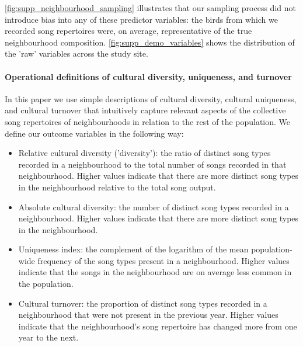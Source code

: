 \documentclass[9pt, onecolumn, twoside, lineno]{gsajnl}
\begin{document}
\noindent\autoref{fig:supp_neighbourhood_sampling} illustrates that our sampling process did not introduce bias into any of these predictor variables: the birds from which we recorded song repertoires were, on average, representative of the true neighbourhood composition. \autoref{fig:supp_demo_variables} shows the distribution of the 'raw' variables across the study site.

\paragraph{Operational definitions of cultural diversity, uniqueness, and turnover}
\label{sc:op-definitions}

In this paper we use simple descriptions of cultural diversity, cultural uniqueness, and cultural turnover that intuitively capture relevant aspects of the collective song repertoires of neighbourhoods in relation to the rest of the population. We define our outcome variables in the following way:

\begin{itemize}
    \item Relative cultural diversity ('diversity'): the ratio of distinct song types recorded in a neighbourhood to the total number of songs recorded in that neighbourhood. Higher values indicate that there are more distinct song types in the neighbourhood relative to the total song output.
    \item Absolute cultural diversity: the number of distinct song types recorded in a neighbourhood. Higher values indicate that there are more distinct song types in the neighbourhood.
    \item Uniqueness index: the complement of the logarithm of the mean population-wide frequency of the song types present in a neighbourhood. Higher values indicate that the songs in the neighbourhood are on average less common in the population.
    \item Cultural turnover: the proportion of distinct song types recorded in a neighbourhood that were not present in the previous year. Higher values indicate that the neighbourhood's song repertoire has changed more from one year to the next.
\end{itemize}
\end{document}
